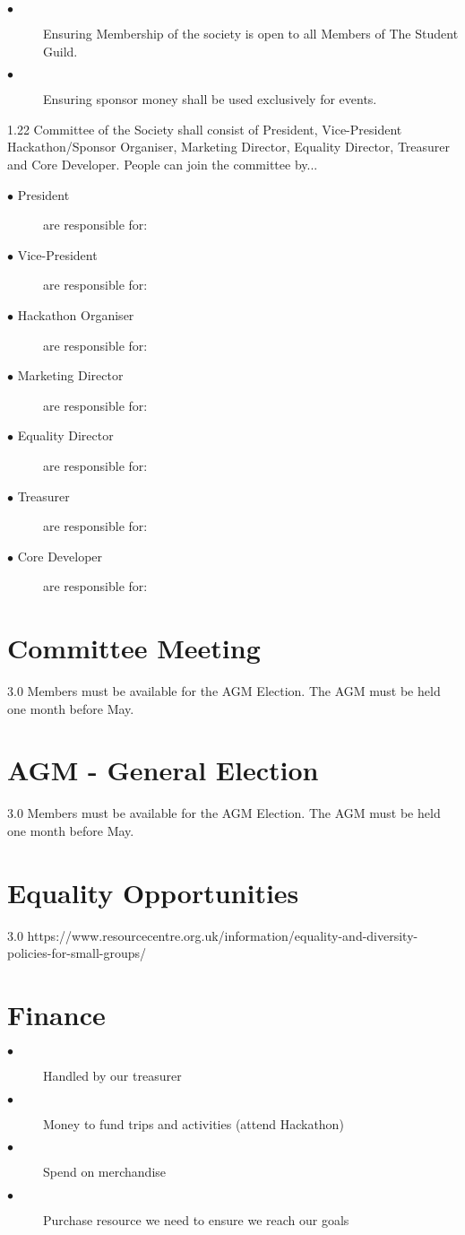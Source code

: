 \documentclass{article}
\begin{document}
\begin{description}
  \item[$\bullet$]Ensuring Membership of the society is open to all Members of The Student Guild.
  \item[$\bullet$]Ensuring sponsor money shall be used exclusively for events.
\end{description}

1.22 Committee of the Society shall consist of President, Vice-President Hackathon/Sponsor Organiser, Marketing Director, Equality Director, Treasurer and Core Developer. People can join the committee by...

\begin{description}
  \item[$\bullet$ President] are responsible for: 
  \item[$\bullet$ Vice-President] are responsible for: 
  \item[$\bullet$ Hackathon Organiser] are responsible for: 
  \item[$\bullet$ Marketing Director] are responsible for: 
  \item[$\bullet$ Equality Director] are responsible for: 
  \item[$\bullet$ Treasurer] are responsible for: 
  \item[$\bullet$ Core Developer] are responsible for: 
\end{description}

\section{Committee Meeting}
3.0 Members must be available for the AGM Election. The AGM must be held one month before May.

\section{AGM - General Election}
3.0 Members must be available for the AGM Election. The AGM must be held one month before May.


\section{Equality Opportunities}
3.0 https://www.resourcecentre.org.uk/information/equality-and-diversity-policies-for-small-groups/

\section{Finance}
\begin{description}
  \item[$\bullet$] Handled by our treasurer
  \item[$\bullet$] Money to fund trips and activities (attend Hackathon)
  \item[$\bullet$] Spend on merchandise
  \item[$\bullet$] Purchase resource we need to ensure we reach our goals
\end{description}
\end{document}

